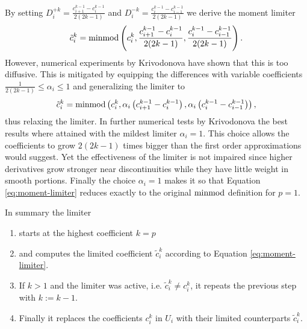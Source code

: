 By setting $D_{i}^{+k} = \frac{c_{i + 1}^{k - 1} - c_{i}^{k - 1}}{2(2k - 1)}$ and $D_{i}^{-k} = \frac{c_{i}^{k - 1} - c_{i - 1}^{k - 1}}{2(2k - 1)}$ we derive the moment limiter
\begin{equation*}
  \tilde{c}_{i}^{k} = \operatorname{minmod}\left( c_{i}^{k}, \frac{c_{i + 1}^{k - 1} - c_{i}^{k - 1}}{2(2k - 1)}, \frac{c_{i}^{k - 1} - c_{i - 1}^{k - 1}}{2(2k - 1)} \right).
\end{equation*}
However, numerical experiments by Krivodonova have shown that this is too diffusive.
This is mitigated by equipping the differences with variable coefficients $\frac{1}{2(2k - 1)} \le \alpha_{i} \le 1$ and generalizing the limiter to
\begin{equation}
  \tilde{c}_{i}^{k} = \operatorname{minmod}\left( c_{i}^{k}, \alpha_{i} \left( c_{i + 1}^{k - 1} - c_{i}^{k - 1} \right), \alpha_{i} \left( c_{i}^{k - 1} - c_{i - 1}^{k - 1} \right) \right), \label{eq:moment-limiter}
\end{equation}
thus relaxing the limiter.
In further numerical tests by Krivodonova the best results where attained with the mildest limiter $\alpha_{i} = 1$.
This choice allows the coefficients to grow $2(2k - 1)$ times bigger than the first order approximations would suggest.
Yet the effectiveness of the limiter is not impaired since higher derivatives grow stronger near discontinuities while they have little weight in smooth portions.
Finally the choice $\alpha_{i} = 1$ makes it so that Equation \eqref{eq:moment-limiter} reduces exactly to the original $\operatorname{minmod}$ definition for $p = 1$.

In summary the limiter
\begin{enumerate}
\item starts at the highest coefficient $k = p$
\item and computes the limited coefficient $\tilde{c}_{i}^{k}$ according to Equation \eqref{eq:moment-limiter}.
\item If $k > 1$ and the limiter was active, i.e. $\tilde{c}_{i}^{k} \ne c_{i}^{k}$, it repeats the previous step with $k := k - 1$.
\item Finally it replaces the coefficients $c_{i}^{k}$ in $U_{i}$ with their limited counterparts $\tilde{c}_{i}^{k}$.
\end{enumerate}
